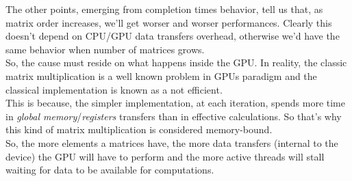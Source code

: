 The other points, emerging from completion times behavior, tell us that, as matrix order increases, we'll get worser and worser performances. Clearly this doesn't depend on CPU/GPU data transfers overhead, otherwise we'd have the same behavior when number of matrices grows.\\
So, the cause must reside on what happens inside the GPU. In reality, the classic matrix multiplication is a well known problem in GPUs paradigm and the classical implementation is known as a not efficient. \\
This is because, the simpler implementation, at each iteration, spends more time in \textit{global memory}/\textit{registers} transfers than in effective calculations. So that's why this kind of matrix multiplication is considered memory-bound.\\
So, the more elements a matrices have, the more data transfers (internal to the device) the GPU will have to perform and the more active threads will stall waiting for data to be available for computations.\\

